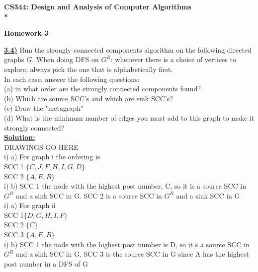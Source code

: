 \documentclass{article}
\begin{document}
\begin{center}
\bf{\LARGE CS344: Design and Analysis of Computer Algorithms} \\*

\vspace{0.2in}
{\bf {\Large Homework 3}}
\end{center}

\vspace{.2in}


\vspace{.2in}
\noindent \textbf{\underline{3.4)}} Run the strongly connected components algorithm on the following directed graphs $G$. When doing DFS on $G^R$: whenever there is a choice of vertices to explore, always pick the one that is alphabetically first. \\
\indent In each case, answer the following questions: \\
\indent (a) in what order are the strongly connected components found? \\
\indent (b) Which are source SCC's and which are sink SCC's? \\
\indent (c) Draw the "metagraph" \\
\indent (d) What is the minimum number of edges you must add to this graph to make it strongly connected? \\

\noindent \textbf{\underline{Solution:}}  \\

DRAWINGS GO HERE \\


\noindent i) a) For graph i the ordering is \\
SCC 1 $\{C, J, F, H, I, G, D\}$\\ 
SCC 2 $\{A, E, B\}$ \\

\noindent i) b) SCC 1 the node with the highest post number, C, so it is a source SCC in $G^R$ and a sink SCC in G. SCC 2 is a source SCC in $G^R$ and a sink SCC in G \\

\noindent i) a) For graph ii \\
SCC 1$\{D, G, H, I, F\}$ \\
SCC 2 $\{C\}$ \\
SCC 3 $\{A, E, B\}$\\

\noindent i) b) SCC 1 the node with the highest post number is D, so it s a source SCC in $G^R$ and a sink SCC in G. SCC 3 is the source SCC in G since A has the highest post number in a DFS of G\\
\end{document}
